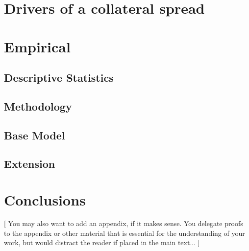\documentclass[11pt,a4paper,english,oneside]{book}
\numberwithin{equation}{chapter}
\begin{document}
\lipsum

\section{Drivers of a collateral spread}

\lipsum

\section{Empirical}

\subsection{Descriptive Statistics}

\lipsum

\subsection{Methodology}

\lipsum

\subsection{Base Model}

\lipsum

\subsection{Extension}

\lipsum

\section{Conclusions}

\lipsum

\newpage

\appendix
\noappendicestocpagenum
\addappheadtotoc

\renewcommand{\theequation}{A.\arabic{equation}}

[ You may also want to add an appendix, if it makes sense. You delegate proofs to the appendix or other material that is essential for the understanding of your work, but would distract the reader if placed in the main text... ]
\end{document}
